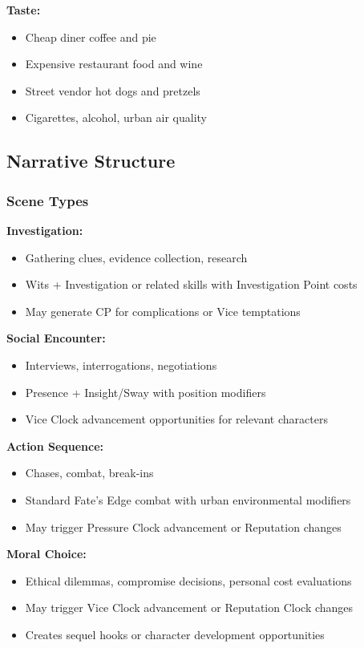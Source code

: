 \documentclass[11pt]{article}
\begin{document}
\textbf{Taste:}
\begin{itemize}
\item Cheap diner coffee and pie
\item Expensive restaurant food and wine
\item Street vendor hot dogs and pretzels
\item Cigarettes, alcohol, urban air quality
\end{itemize}

\subsection{Narrative Structure}

\subsubsection{Scene Types}

\textbf{Investigation:}
\begin{itemize}
\item Gathering clues, evidence collection, research
\item Wits + Investigation or related skills with Investigation Point costs
\item May generate CP for complications or Vice temptations
\end{itemize}

\textbf{Social Encounter:}
\begin{itemize}
\item Interviews, interrogations, negotiations
\item Presence + Insight/Sway with position modifiers
\item Vice Clock advancement opportunities for relevant characters
\end{itemize}

\textbf{Action Sequence:}
\begin{itemize}
\item Chases, combat, break-ins
\item Standard Fate's Edge combat with urban environmental modifiers
\item May trigger Pressure Clock advancement or Reputation changes
\end{itemize}

\textbf{Moral Choice:}
\begin{itemize}
\item Ethical dilemmas, compromise decisions, personal cost evaluations
\item May trigger Vice Clock advancement or Reputation Clock changes
\item Creates sequel hooks or character development opportunities
\end{itemize}
\end{document}
